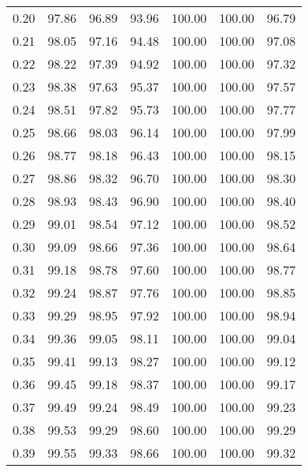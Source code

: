 \begin{tabular}{|c|c|c|c|c|c|c|}
      0.20 &     97.86 &     96.89 &      93.96 &  100.00 &     100.00 &         96.79 \\
      0.21 &     98.05 &     97.16 &      94.48 &  100.00 &     100.00 &         97.08 \\
      0.22 &     98.22 &     97.39 &      94.92 &  100.00 &     100.00 &         97.32 \\
      0.23 &     98.38 &     97.63 &      95.37 &  100.00 &     100.00 &         97.57 \\
      0.24 &     98.51 &     97.82 &      95.73 &  100.00 &     100.00 &         97.77 \\
      0.25 &     98.66 &     98.03 &      96.14 &  100.00 &     100.00 &         97.99 \\
      0.26 &     98.77 &     98.18 &      96.43 &  100.00 &     100.00 &         98.15 \\
      0.27 &     98.86 &     98.32 &      96.70 &  100.00 &     100.00 &         98.30 \\
      0.28 &     98.93 &     98.43 &      96.90 &  100.00 &     100.00 &         98.40 \\
      0.29 &     99.01 &     98.54 &      97.12 &  100.00 &     100.00 &         98.52 \\
      0.30 &     99.09 &     98.66 &      97.36 &  100.00 &     100.00 &         98.64 \\
      0.31 &     99.18 &     98.78 &      97.60 &  100.00 &     100.00 &         98.77 \\
      0.32 &     99.24 &     98.87 &      97.76 &  100.00 &     100.00 &         98.85 \\
      0.33 &     99.29 &     98.95 &      97.92 &  100.00 &     100.00 &         98.94 \\
      0.34 &     99.36 &     99.05 &      98.11 &  100.00 &     100.00 &         99.04 \\
      0.35 &     99.41 &     99.13 &      98.27 &  100.00 &     100.00 &         99.12 \\
      0.36 &     99.45 &     99.18 &      98.37 &  100.00 &     100.00 &         99.17 \\
      0.37 &     99.49 &     99.24 &      98.49 &  100.00 &     100.00 &         99.23 \\
      0.38 &     99.53 &     99.29 &      98.60 &  100.00 &     100.00 &         99.29 \\
      0.39 &     99.55 &     99.33 &      98.66 &  100.00 &     100.00 &         99.32 \\

\end{tabular}
